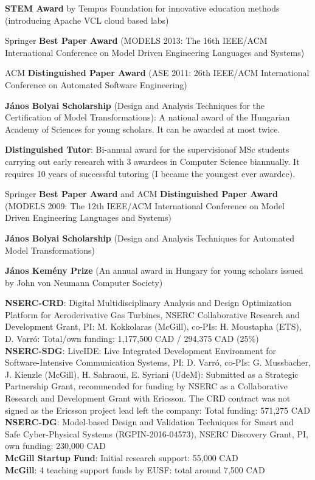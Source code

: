 \documentclass{xetexCV}
\begin{document}
\textbf{STEM Award}  by Tempus Foundation for innovative education methods (introducing Apache VCL cloud based labs)

Springer  \textbf{Best Paper Award} (MODELS 2013: The 16th IEEE/ACM International Conference on Model Driven 
Engineering Languages and Systems) 

ACM \textbf{Distinguished Paper Award} (ASE 2011: 26th IEEE/ACM International Conference on Automated Software Engineering) 

\textbf{J\'anos Bolyai Scholarship} (Design and Analysis Techniques for the Certification of Model Transformations): A national award of the Hungarian Academy of Sciences for young scholars. It can be awarded
at most twice.

\textbf{Distinguished Tutor}:  Bi-annual award for the supervisionof MSc students carrying out early research with 3 awardees in Computer Science biannually. It requires 10 years of successful tutoring (I became the youngest ever awardee). 

Springer \textbf{Best Paper Award} and ACM \textbf{Distinguished Paper Award} \newline (MODELS
2009: The 12th IEEE/ACM International Conference on Model Driven Engineering Languages and
Systems) 

\textbf{J\'anos Bolyai Scholarship}  (Design and Analysis Techniques
for Automated Model Transformations) 

\textbf{J\'anos Kem\'eny Prize } (An annual
award in Hungary for young scholars issued by John von Neumann Computer Society)




\textbf{NSERC-CRD}:  Digital Multidisciplinary Analysis and Design Optimization Platform for Aeroderivative Gas Turbines, NSERC Collaborative Research and Development Grant, PI: M. Kokkolaras (McGill), co-PIs: H. Moustapha (ETS), 
D. Varr\'o:  Total/own funding: 1,177,500 CAD / 294,375 CAD (25\%)\\
\textbf{NSERC-SDG}:  LiveIDE: Live Integrated Development Environment for Software-Intensive Communication Systems, PI: D. Varr\'o, co-PIs: G. Mussbacher, J. Kienzle (McGill), H. Sahraoui, E. Syriani (UdeM): Submitted as a Strategic Partnership Grant, recommended for funding by NSERC as a Collaborative Research and Development Grant with Ericsson. The CRD contract was not signed as the Ericsson project lead left the company: Total funding: 571,275 CAD\\
\textbf{NSERC-DG}:  Model-based Design and Validation Techniques for
Smart and Safe Cyber-Physical Systems (RGPIN-2016-04573), NSERC Discovery Grant, PI, own funding: 230,000 CAD \\
\textbf{McGill Startup Fund}:  Initial research support: 55,000 CAD \\
\textbf{McGill}:  4 teaching support funds by EUSF: total around 7,500 CAD \\
\end{document}
